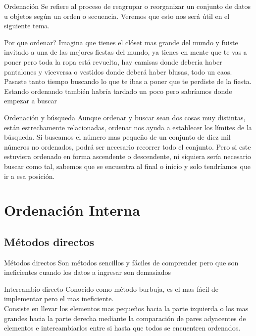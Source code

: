 \documentclass{beamer}
\begin{document}
\begin{frame}{Ordenaci\'on}
	Se refiere al proceso de reagrupar o reorganizar un conjunto de datos u objetos seg\'un un orden o secuencia.
	Veremos que esto nos ser\'a \'util en el siguiente tema.
\end{frame}

\begin{frame}{\textquestiondown Por que ordenar?}
	Imagina que tienes el cl\'oset mas grande del mundo y fuiste invitado a una de las mejores fiestas del mundo, ya tienes en mente que te  vas
	a poner pero toda la ropa est\'a revuelta, hay camisas  donde debería haber pantalones y viceversa o vestidos donde deber\'a haber blusas, todo un caos.
	Pasaste tanto tiempo buscando lo que te ibas a poner que te perdiste de la fiesta.
	Estando ordenando tambi\'en habr\'ia tardado un poco pero sabr\'iamos donde empezar a buscar
\end{frame}

\begin{frame}{Ordenaci\'on y b\'usqueda}
	Aunque ordenar y buscar sean dos cosas muy distintas, est\'an estrechamente relacionadas, ordenar nos ayuda a establecer los l\'imites de la b\'usqueda.
	Si buscamos el n\'umero mas pequeño de un conjunto de diez mil n\'umeros no ordenados, podr\'a ser necesario recorrer todo el conjunto.
	Pero si este estuviera ordenado en forma ascendente o descendente, ni siquiera ser\'ia necesario buscar como tal, sabemos que se encuentra al final o  inicio y
	solo tendr\'iamos que ir a esa posici\'on. 
\end{frame}

\section{Ordenaci\'on Interna}

\subsection{M\'etodos directos}
\begin{frame}{M\'etodos directos}
	Son m\'etodos sencillos y f\'aciles de comprender pero que son ineficientes cuando los datos a ingresar son demasiados
\end{frame}

\begin{frame}{Intercambio directo}
	Conocido como m\'etodo burbuja, es el mas f\'acil de implementar pero el mas ineficiente.\\
	Consiste en llevar los elementos mas pequeños hacia la parte izquierda o los mas grandes hacia la parte derecha mediante la
	comparaci\'on de pares adyacentes de elementos e intercambiarlos entre si hasta que todos se encuentren ordenados.
\end{frame}
\end{document}

